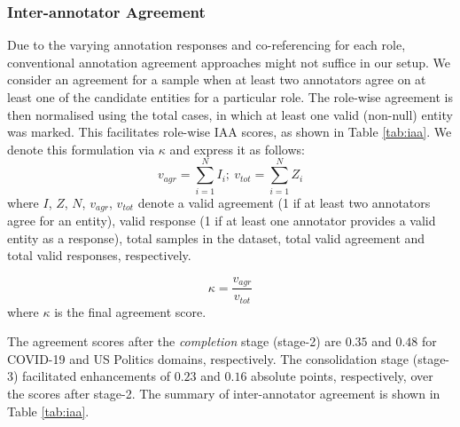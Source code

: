 \documentclass[11pt]{article}
\begin{document}
\subsubsection{Inter-annotator Agreement}
Due to the varying annotation responses and co-referencing for each role, conventional annotation agreement approaches might not suffice in our setup. We consider an agreement for a sample when at least two annotators agree on at least one of the candidate entities for a particular role. The role-wise agreement is then normalised using the total cases, in which at least one valid (non-null) entity was marked. This facilitates role-wise IAA scores, as shown in Table  \ref{tab:iaa}. We denote this formulation via $\kappa$ and express it as follows:
\begin{equation}
    v_{agr} = \sum_{i=1}^{N}I_{i};~v_{tot} = \sum_{i=1}^{N}Z_{i}
\end{equation}
where $I$, $Z$, $N$, $v_{agr}$, $v_{tot}$ denote a valid agreement (1 if at least two annotators agree for an entity), valid response (1 if at least one annotator provides a valid entity as a response), total samples in the dataset, total valid agreement and total valid responses, respectively.

\begin{equation}
    \kappa = \frac{v_{agr}}{v_{tot}}
\end{equation}
where $\kappa$ is the final agreement score. 
    

The agreement scores after the \textit{completion} stage (stage-2) are $0.35$ and $0.48$ for COVID-19 and US Politics domains, respectively. The consolidation stage (stage-3) facilitated enhancements of $0.23$ and $0.16$ absolute points, respectively, over the scores after stage-2. The summary of inter-annotator agreement is shown in Table \ref{tab:iaa}.
\end{document}
